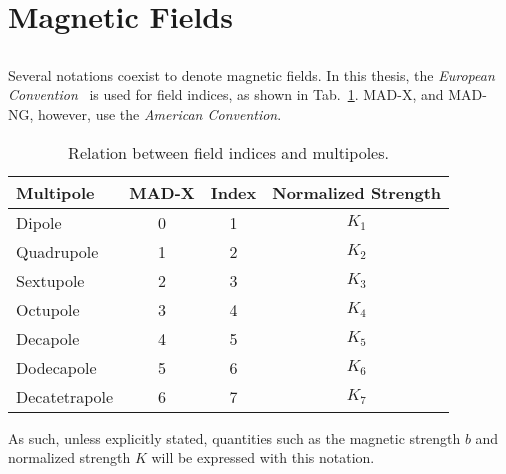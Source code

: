\section{Magnetic Fields}

\subsection{}

Several notations coexist to denote magnetic fields. In this thesis, the
\textit{European Convention}~\cite{dilly_corrections_2022} is used for field indices, as shown
in Tab.~\ref{tab:magnetic_fields:relation_indices}. MAD-X, and MAD-NG, however, use the
\textit{American Convention}.

\begin{table}[H]
    \centering
    \begin{tabular}{l|c|c|c}
        Multipole     &      MAD-X        &     Index        & Normalized Strength \\
    \hline            
        Dipole        &     0             &     1            & $K_1$   \\       
        Quadrupole    &     1             &     2            & $K_2 $  \\
        Sextupole     &     2             &     3            & $K_3 $  \\
        Octupole      &     3             &     4            & $K_4 $  \\
        Decapole      &     4             &     5            & $K_5 $  \\
        Dodecapole    &     5             &     6            & $K_6 $  \\
        Decatetrapole &     6             &     7            & $K_7 $  \\
    \end{tabular}
    \caption{Relation between field indices and multipoles.}
    \label{tab:magnetic_fields:relation_indices}
\end{table}

As such, unless explicitly stated, quantities such as the magnetic strength $b$ and normalized
strength $K$ will be expressed with this notation. 


\subsection{}

